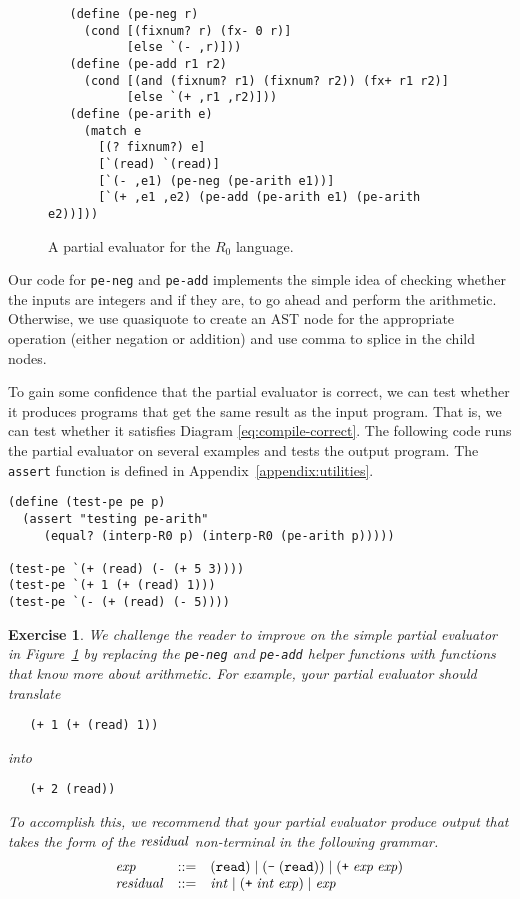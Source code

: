 \documentclass[11pt]{book}
\newtheorem{exercise}[theorem]{Exercise}
\begin{document}
\begin{figure}[tbp]
\begin{lstlisting}
   (define (pe-neg r)
     (cond [(fixnum? r) (fx- 0 r)]
           [else `(- ,r)]))
   (define (pe-add r1 r2)
     (cond [(and (fixnum? r1) (fixnum? r2)) (fx+ r1 r2)]
           [else `(+ ,r1 ,r2)]))
   (define (pe-arith e)
     (match e
       [(? fixnum?) e]
       [`(read) `(read)]
       [`(- ,e1) (pe-neg (pe-arith e1))]
       [`(+ ,e1 ,e2) (pe-add (pe-arith e1) (pe-arith e2))]))   
\end{lstlisting}
\caption{A partial evaluator for the $R_0$ language.}
\label{fig:pe-arith}
\end{figure}

Our code for \texttt{pe-neg} and \texttt{pe-add} implements the simple
idea of checking whether the inputs are integers and if they are, to
go ahead and perform the arithmetic.  Otherwise, we use quasiquote to
create an AST node for the appropriate operation (either negation or
addition) and use comma to splice in the child nodes.

To gain some confidence that the partial evaluator is correct, we can
test whether it produces programs that get the same result as the
input program. That is, we can test whether it satisfies Diagram
\eqref{eq:compile-correct}. The following code runs the partial
evaluator on several examples and tests the output program.  The
\texttt{assert} function is defined in Appendix~\ref{appendix:utilities}.
\begin{lstlisting}
(define (test-pe pe p)
  (assert "testing pe-arith"
     (equal? (interp-R0 p) (interp-R0 (pe-arith p)))))

(test-pe `(+ (read) (- (+ 5 3))))
(test-pe `(+ 1 (+ (read) 1)))
(test-pe `(- (+ (read) (- 5))))
\end{lstlisting}

\begin{exercise}
\normalfont %
We challenge the reader to improve on the simple partial evaluator in
Figure~\ref{fig:pe-arith} by replacing the \texttt{pe-neg} and
\texttt{pe-add} helper functions with functions that know more about
arithmetic. For example, your partial evaluator should translate
\begin{lstlisting}
   (+ 1 (+ (read) 1))
\end{lstlisting}
into
\begin{lstlisting}
   (+ 2 (read))
\end{lstlisting}
To accomplish this, we recommend that your partial evaluator produce
output that takes the form of the $\mathit{residual}$ non-terminal in the
following grammar.
\[
\begin{array}{lcl}
\mathit{exp} &::=& (\texttt{read}) \mid (\texttt{-} \;(\texttt{read})) \mid (\texttt{+} \; \mathit{exp} \; \mathit{exp})\\
\mathit{residual} &::=& \mathit{int} \mid (\texttt{+}\; \mathit{int}\; \mathit{exp}) \mid \mathit{exp}
\end{array}
\]
\end{exercise}
\end{document}
